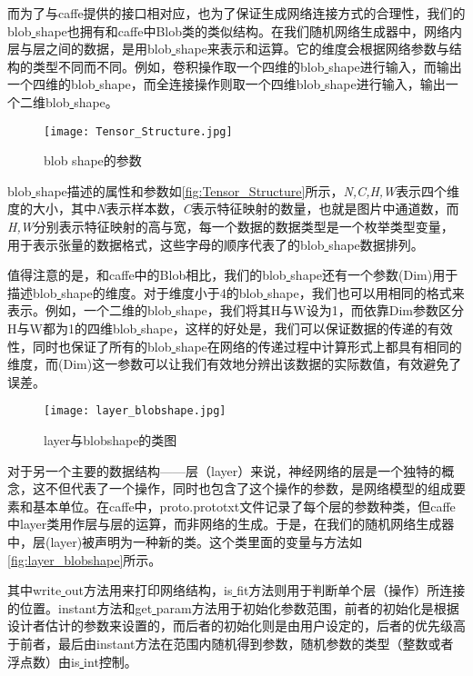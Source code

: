 而为了与caffe提供的接口相对应，也为了保证生成网络连接方式的合理性，我们的blob\underline{ }shape也拥有和caffe中Blob类的类似结构。在我们随机网络生成器中，网络内层与层之间的数据，是用blob\underline{ }shape来表示和运算。它的维度会根据网络参数与结构的类型不同而不同。例如，卷积操作取一个四维的blob\underline{ }shape进行输入，而输出一个四维的blob\underline{ }shape，而全连接操作则取一个四维blob\underline{ }shape进行输入，输出一个二维blob\underline{ }shape。

\begin{figure}[!htbp]
\centering
\texttt{[image: Tensor\_Structure.jpg]}
\caption{blob shape的参数}
\label{fig:Tensor_Structure}
\end{figure}

blob\underline{ }shape描述的属性和参数如\autoref{fig:Tensor_Structure}所示，\emph{N,C,H,W}表示四个维度的大小，其中\emph{N}表示样本数，\emph{C}表示特征映射的数量，也就是图片中通道数，而\emph{H,W}分别表示特征映射的高与宽，每一个数据的数据类型是一个枚举类型变量，用于表示张量的数据格式，这些字母的顺序代表了的blob\underline{ }shape数据排列。

值得注意的是，和caffe中的Blob相比，我们的blob\underline{ }shape还有一个参数(Dim)用于描述blob\underline{ }shape的维度。对于维度小于4的blob\underline{ }shape，我们也可以用相同的格式来表示。例如，一个二维的blob\underline{ }shape，我们将其H与W设为1，而依靠Dim参数区分H与W都为1的四维blob\underline{ }shape，这样的好处是，我们可以保证数据的传递的有效性，同时也保证了所有的blob\underline{ }shape在网络的传递过程中计算形式上都具有相同的维度，而(Dim)这一参数可以让我们有效地分辨出该数据的实际数值，有效避免了误差。

\begin{figure}[!htbp]
\centering
\texttt{[image: layer\_blobshape.jpg]}
\caption{layer与blobshape的类图}
\label{fig:layer_blobshape}
\end{figure}

对于另一个主要的数据结构——层（layer）来说，神经网络的层是一个独特的概念，这不但代表了一个操作，同时也包含了这个操作的参数，是网络模型的组成要素和基本单位。在caffe中，proto.prototxt文件记录了每个层的参数种类，但caffe中layer类用作层与层的运算，而非网络的生成。于是，在我们的随机网络生成器中，层(layer)被声明为一种新的类。这个类里面的变量与方法如\autoref{fig:layer_blobshape}所示。

其中write\underline{ }out方法用来打印网络结构，is\underline{ }fit方法则用于判断单个层（操作）所连接的位置。instant方法和get\underline{ }param方法用于初始化参数范围，前者的初始化是根据设计者估计的参数来设置的，而后者的初始化则是由用户设定的，后者的优先级高于前者，最后由instant方法在范围内随机得到参数，随机参数的类型（整数或者浮点数）由is\underline{ }int控制。

